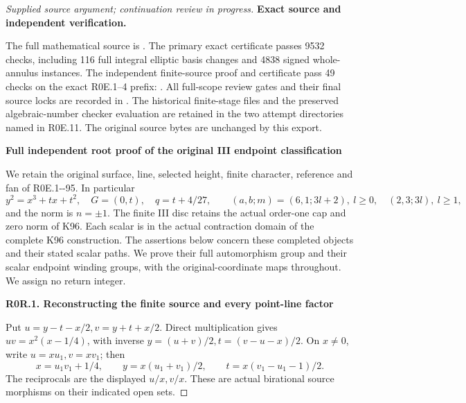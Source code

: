 \begin{proof}[Supplied source argument; continuation review in progress]
\par\medskip\noindent\textbf{Exact source and independent verification.}\par
The full mathematical source is
.
The primary exact certificate passes 9532 checks, including 116 full
integral elliptic basis changes and 4838 signed whole-annulus
instances. The independent finite-source proof and certificate pass
49 checks on the exact R0E.1--4 prefix:
.
All full-scope review gates and their final source locks are recorded
in .
The historical finite-stage files and the preserved algebraic-number
checker evaluation are retained in the two attempt directories named
in R0E.11. The original source bytes are unchanged by this export.


\par\bigskip\noindent\textbf{Full independent root proof of the original III endpoint classification}\par\nobreak

We retain the original surface, line, selected height, finite character,
reference and fan of R0E.1-\/-95. In particular
\[
 y^2=x^3+tx+t^2,\quad G=(0,t),\quad q=t+4/27,
 \qquad (a,b;m)=(6,1;3l+2),\ l\ge0,
 \quad (2,3;3l),\ l\ge1,
 \tag{R0R.1}
\]
and the norm is \(n=\pm1\). The finite III disc retains the actual
order-one cap and zero norm of K96. Each scalar is in the actual contraction
domain of the complete K96 construction. The assertions below concern
these completed objects and their stated scalar paths. We prove their
full automorphism group and their scalar endpoint winding groups, with
the original-coordinate maps throughout. We assign no return integer.

\par

\medskip\noindent\textbf{R0R.1. Reconstructing the finite source and every point-line factor}

\par\nobreak

Put \(u=y-t-x/2,v=y+t+x/2\). Direct multiplication gives
\(uv=x^2(x-1/4)\), with inverse
\(y=(u+v)/2,t=(v-u-x)/2\). On \(x\ne0\), write
\(u=xu_1,v=xv_1\); then
\[
 x=u_1v_1+1/4,\qquad y=x(u_1+v_1)/2,
 \qquad t=x(v_1-u_1-1)/2.                       \tag{R0R.2}
\]
The reciprocals are the displayed \(u/x,v/x\). These are actual
birational source morphisms on their indicated open sets.


\end{proof}
